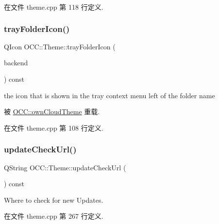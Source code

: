 在文件 theme.\+cpp 第 118 行定义.

\mbox{\label{class_o_c_c_1_1_theme_ab4b9822667ab5ba98fd2ce9786282ab7}} 
\subsubsection{\texorpdfstring{tray\+Folder\+Icon()}{trayFolderIcon()}}
{\footnotesize\ttfamily Q\+Icon O\+C\+C\+::\+Theme\+::tray\+Folder\+Icon (\begin{DoxyParamCaption}\item[{const Q\+String \&}]{backend }\end{DoxyParamCaption}) const\hspace{0.3cm}{\ttfamily [virtual]}}

the icon that is shown in the tray context menu left of the folder name 

被 \hyperlink{class_o_c_c_1_1own_cloud_theme_a1f64a30c0d6ecb85fb009a3d776b50c1}{O\+C\+C\+::own\+Cloud\+Theme} 重载.



在文件 theme.\+cpp 第 108 行定义.

\mbox{\label{class_o_c_c_1_1_theme_a3c27a3a46ea0fc7e6569d467d403c76f}} 
\subsubsection{\texorpdfstring{update\+Check\+Url()}{updateCheckUrl()}}
{\footnotesize\ttfamily Q\+String O\+C\+C\+::\+Theme\+::update\+Check\+Url (\begin{DoxyParamCaption}{ }\end{DoxyParamCaption}) const\hspace{0.3cm}{\ttfamily [virtual]}}



Where to check for new Updates. 



在文件 theme.\+cpp 第 267 行定义.

\mbox{\label{class_o_c_c_1_1_theme_a8ffc69e13d525977ec8ab272ecaba96c}} 
